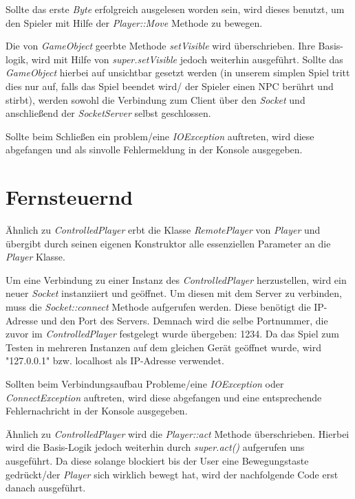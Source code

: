 \documentclass{pi1}
\begin{document}
Sollte das erste \textit{Byte} erfolgreich ausgelesen worden sein, wird dieses benutzt, um den Spieler mit Hilfe der \textit{Player::Move} Methode zu bewegen.


Die von \textit{GameObject} geerbte Methode  \textit{setVisible} wird überschrieben. Ihre Basis-logik, wird mit Hilfe von \textit{super.setVisible} jedoch weiterhin ausgeführt. Sollte das \textit{GameObject} hierbei auf unsichtbar gesetzt werden (in unserem simplen Spiel tritt dies nur auf, falls das Spiel beendet wird/ der Spieler einen NPC berührt und stirbt), werden sowohl die Verbindung zum Client über den \textit{Socket} und anschließend der \textit{SocketServer} selbst geschlossen.

Sollte beim Schließen ein problem/eine \textit{IOException} auftreten, wird diese abgefangen und als sinvolle Fehlermeldung in der Konsole ausgegeben.

\newpage
\section{Fernsteuernd}

Ähnlich zu \textit{ControlledPlayer} erbt die Klasse \textit{RemotePlayer} von \textit{Player} und übergibt durch seinen eigenen Konstruktor alle essenziellen Parameter an die \textit{Player} Klasse.

Um eine Verbindung zu einer Instanz des \textit{ControlledPlayer} herzustellen, wird ein neuer \textit{Socket} instanziiert und geöffnet. Um diesen mit dem Server zu verbinden, muss die \textit{Socket::connect} Methode aufgerufen werden. Diese benötigt die IP-Adresse und den Port des Servers. Demnach wird die selbe Portnummer, die zuvor im \textit{ControlledPlayer} festgelegt wurde übergeben: 1234.
Da das Spiel zum Testen in mehreren Instanzen auf dem gleichen Gerät geöffnet wurde, wird "127.0.0.1" bzw. localhost als IP-Adresse verwendet.

Sollten beim Verbindungsaufbau Probleme/eine \textit{IOException} oder \textit{ConnectException} auftreten, wird diese abgefangen und eine entsprechende Fehlernachricht in der Konsole ausgegeben.


Ähnlich zu \textit{ControlledPlayer} wird die \textit{Player::act} Methode überschrieben. Hierbei wird die Basis-Logik jedoch weiterhin durch \textit{super.act()} aufgerufen uns ausgeführt. Da diese solange blockiert bis der User eine Bewegungstaste gedrückt/der \textit{Player} sich wirklich bewegt hat, wird der nachfolgende Code erst danach ausgeführt.
\end{document}
